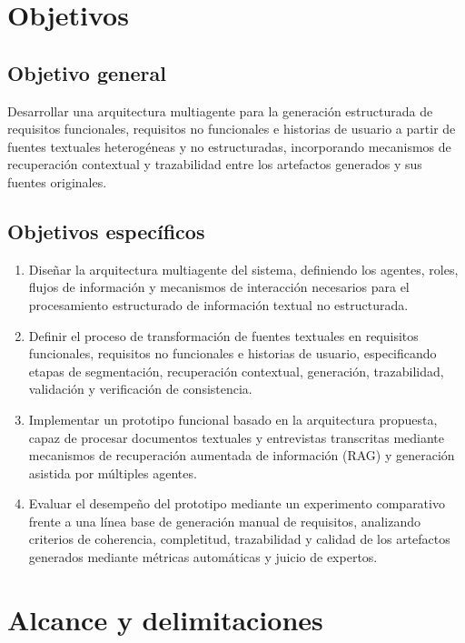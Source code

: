 \section{Objetivos}

\subsection{Objetivo general}

Desarrollar una arquitectura multiagente para la generación estructurada de requisitos funcionales, requisitos no funcionales e historias de usuario a partir de fuentes textuales heterogéneas y no estructuradas, incorporando mecanismos de recuperación contextual y trazabilidad entre los artefactos generados y sus fuentes originales.

\subsection{Objetivos específicos}

\begin{enumerate}
  \item Diseñar la arquitectura multiagente del sistema, definiendo los agentes, roles, flujos de información y mecanismos de interacción necesarios para el procesamiento estructurado de información textual no estructurada.
  \item Definir el proceso de transformación de fuentes textuales en requisitos funcionales, requisitos no funcionales e historias de usuario, especificando etapas de segmentación, recuperación contextual, generación, trazabilidad, validación y verificación de consistencia.
  \item Implementar un prototipo funcional basado en la arquitectura propuesta, capaz de procesar documentos textuales y entrevistas transcritas mediante mecanismos de recuperación aumentada de información (RAG) y generación asistida por múltiples agentes.
  \item Evaluar el desempeño del prototipo mediante un experimento comparativo frente a una línea base de generación manual de requisitos, analizando criterios de coherencia, completitud, trazabilidad y calidad de los artefactos generados mediante métricas automáticas y juicio de expertos.
\end{enumerate}

\section{Alcance y delimitaciones}

